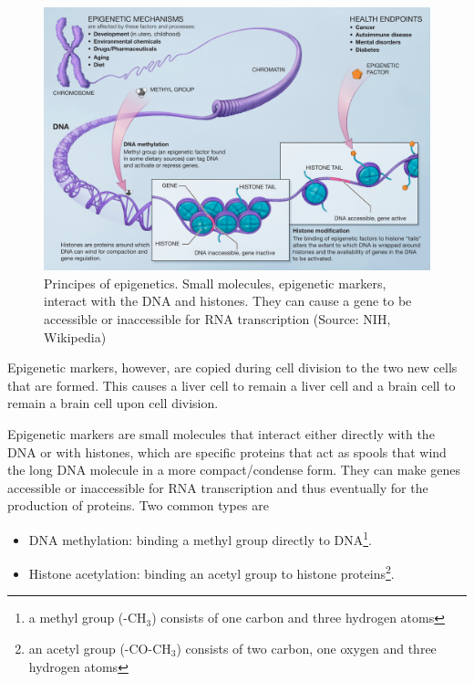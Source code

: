\documentclass[
  11pt,
]{book}
\providecommand{\tightlist}{%
  \setlength{\itemsep}{0pt}\setlength{\parskip}{0pt}}
\begin{document}
\begin{figure}

{\centering \includegraphics[width=1\linewidth]{./figs/Epigenetic_mechanisms} 

}

\caption{Principes of epigenetics. Small molecules, epigenetic markers, interact with the DNA and histones. They can cause a gene to be accessible or inaccessible for RNA transcription (Source: NIH, Wikipedia)}\label{fig:epigenetics}
\end{figure}

Epigenetic markers, however, are copied during cell division to the two new cells that are formed. This causes a liver cell to remain a liver cell and a brain cell to remain a brain cell upon cell division.

Epigenetic markers are small molecules that interact either directly with the DNA or with histones, which are specific proteins that act as spools that wind the long DNA molecule in a more compact/condense form.
They can make genes accessible or inaccessible for RNA transcription and thus eventually for the production of proteins. Two common types are

\begin{itemize}
\tightlist
\item
  DNA methylation: binding a methyl group directly to DNA\footnote{a methyl group (-CH\(_3\)) consists of one carbon and three hydrogen atoms}.
\item
  Histone acetylation: binding an acetyl group to histone proteins\footnote{an acetyl group (-CO-CH\(_3\)) consists of two carbon, one oxygen and three hydrogen atoms}.
\end{itemize}
\end{document}
